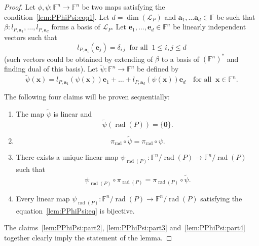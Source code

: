 \documentclass{elsarticle}
\DeclareMathOperator{\rad}{rad}
\def\F{{\mathbb F}}
\def\L{{\mathcal L}}
\theoremstyle{definition}
\numberwithin{equation}{section}
\begin{document}
\begin{proof} 
Let $\phi, \psi \colon \F^n \to \F^n$ be two maps satisfying the condition~\eqref{lem:PPhiPsi:eqq1}. Let $d = \dim (\mathcal L_P)$ and $\mathbf a_1, \ldots \mathbf a_d \in \F$ be such that $\beta \colon l_{P, \mathbf a_1}, \ldots, l_{P, \mathbf a_d}$ forms a basis of $\L_P$. Let $\mathbf e_1, \ldots, \mathbf e_d \in \F^n$ be linearly independent vectors such that 
\begin{equation}\label{lem:PPhiPsi:eq6}
l_{P, \mathbf a_i}(\mathbf e_j) = \delta_{i\,j}\;\;\mbox{for all}\;\; 1 \le i, j \le d
\end{equation}
 (such vectors could be obtained by extending of $\beta$ to a basis of $\left(\F^n\right)^*$ and finding dual of this basis). Let $\tilde{\psi}\colon \F^n \to \F^n$ be defined by
\begin{equation}\label{lem:PPhiPsi:eq4}
\tilde{\psi}(\mathbf x) = l_{P, \mathbf a_1} \left(\psi(\mathbf x)\right)\mathbf e_1 +  \ldots + l_{P, \mathbf a_d} \left(\psi(\mathbf x)\right)\mathbf e_d\quad\mbox{for all}\;\; \mathbf x \in \F^n.
\end{equation}

The following four claims will be proven sequentially:
\begin{enumerate}[label=(\roman*), ref=(\roman*)]
\item\label{lem:PPhiPsi:part1} The map $\tilde{\psi}$ is linear and 
\begin{equation}\label{lem:PPhiPsi:eqq4}
\tilde{\psi}(\rad(P)) = \{\mathbf 0\}.
\end{equation}
\item\label{lem:PPhiPsi:part2} 
\begin{equation}\label{lem:PPhiPsi:eqq6}
\pi_{\rad} \circ \tilde{\psi} = \pi_{\rad} \circ \psi.
\end{equation}
\item\label{lem:PPhiPsi:part3} There exists a unique linear map $\psi_{\rad(P)} \colon \F^n / \rad(P) \to \F^n / \rad(P)$ such that 
\begin{equation}\label{lem:PPhiPsi:eqq5}
\psi_{\rad(P)} \circ \pi_{\rad(P)} = \pi_{\rad(P)} \circ \tilde{\psi}.
\end{equation}
\item\label{lem:PPhiPsi:part4} Every linear map $\psi_{\rad(P)} \colon \F^n / \rad(P) \to \F^n / \rad(P)$ satisfying the equation~\eqref{lem:PPhiPsi:eq} is bijective.
\end{enumerate}

The claims~\ref{lem:PPhiPsi:part2}, \ref{lem:PPhiPsi:part3} and~\ref{lem:PPhiPsi:part4} together clearly imply the statement of the lemma.


\end{proof}
\end{document}
